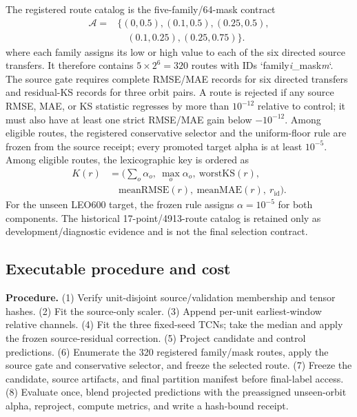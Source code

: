 \documentclass[journal]{IEEEtran}
\begin{document}
The registered route catalog is the five-family/64-mask contract
\begin{equation*}
\begin{aligned}
 \mathcal A={}&\{(0,0.5),(0.1,0.5),(0.25,0.5),\\[-1pt]
 &\quad(0.1,0.25),(0.25,0.75)\}.
\end{aligned}
\end{equation*}
where each family assigns its low or high value to each of the six directed source transfers. It therefore contains $5\times2^6=320$ routes with IDs `family\textit{i}\_mask\textit{m}`. The source gate requires complete RMSE/MAE records for six directed transfers and residual-KS records for three orbit pairs. A route is rejected if any source RMSE, MAE, or KS statistic regresses by more than $10^{-12}$ relative to control; it must also have at least one strict RMSE/MAE gain below $-10^{-12}$. Among eligible routes, the registered conservative selector and the uniform-floor rule are frozen from the source receipt; every promoted target alpha is at least $10^{-5}$. Among eligible routes, the lexicographic key is ordered as
\begin{equation*}
\begin{aligned}
K(r)&=\bigl(\textstyle\sum_o\alpha_o,\ \max_o\alpha_o,\ \mathrm{worstKS}(r),\\[-1pt]
&\quad \mathrm{meanRMSE}(r),\ \mathrm{meanMAE}(r),\ r_{\mathrm{id}}\bigr).
\end{aligned}
\end{equation*}
For the unseen LEO600 target, the frozen rule assigns $\alpha=10^{-5}$ for both components. The historical 17-point/4913-route catalog is retained only as development/diagnostic evidence and is not the final selection contract.

\subsection{Executable procedure and cost}
\noindent\textbf{Procedure.} (1) Verify unit-disjoint source/validation membership and tensor hashes. (2) Fit the source-only scaler. (3) Append per-unit earliest-window relative channels. (4) Fit the three fixed-seed TCNs; take the median and apply the frozen source-residual correction. (5) Project candidate and control predictions. (6) Enumerate the 320 registered family/mask routes, apply the source gate and conservative selector, and freeze the selected route. (7) Freeze the candidate, source artifacts, and final partition manifest before final-label access. (8) Evaluate once, blend projected predictions with the preassigned unseen-orbit alpha, reproject, compute metrics, and write a hash-bound receipt.
\end{document}
